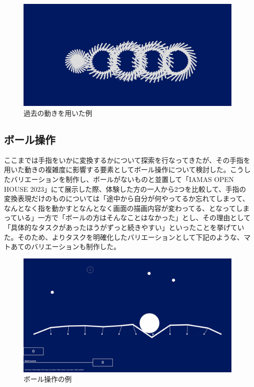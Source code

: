 \begin{figure}[H]
  \centering
  \includegraphics[width=15cm]{img/past_time.png}
  \caption{過去の動きを用いた例}
  \label{fig:prototype_delay}
\end{figure}

\subsection{ボール操作}
ここまでは手指をいかに変換するかについて探索を行なってきたが、その手指を用いた動きの複雑度に影響する要素としてボール操作について検討した。こうしたバリエーションを制作し、ボールがないものと並置して「IAMAS OPEN HOUSE 2023」にて展示した際、体験した方の一人から2つを比較して、手指の変換表現だけのものについては「途中から自分が何やってるか忘れてしまって、なんとなく指を動かすとなんとなく画面の描画内容が変わってる、となってしまっている」一方で「ボールの方はそんなことはなかった」とし、その理由として「具体的なタスクがあったほうがずっと続きやすい」といったことを挙げていた。そのため、よりタスクを明確化したバリエーションとして下記のような、マトあてのバリエーションも制作した。

\begin{figure}[H]
  \centering
  \includegraphics[width=15cm]{img/ball_overview.png}
  \caption{ボール操作の例}
  \label{fig:ball_overview}
\end{figure}

